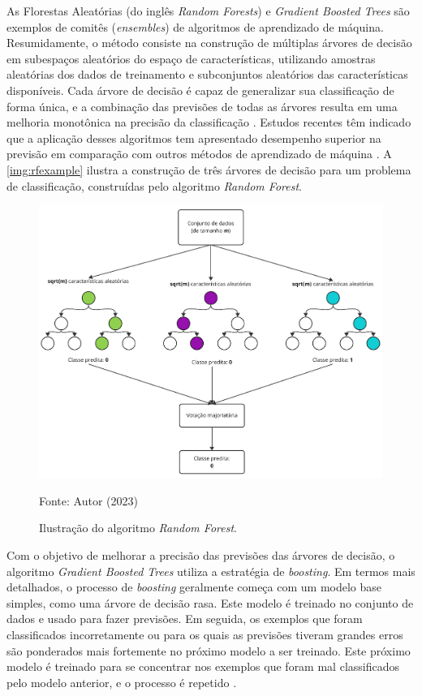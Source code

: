 As Florestas Aleatórias (do inglês \textit{Random Forests}) e \textit{Gradient Boosted Trees} são exemplos de comitês (\textit{ensembles}) de algoritmos de aprendizado de máquina. Resumidamente, o método consiste na construção de múltiplas árvores de decisão em subespaços aleatórios do espaço de características, utilizando amostras aleatórias dos dados de treinamento e subconjuntos aleatórios das características disponíveis. Cada árvore de decisão é capaz de generalizar sua classificação de forma única, e a combinação das previsões de todas as árvores resulta em uma melhoria monotônica na precisão da classificação \cite{RandomForests}. Estudos recentes têm indicado que a aplicação desses algoritmos tem apresentado desempenho superior na previsão em comparação com outros métodos de aprendizado de máquina \cite{geron2022hands, Raschka}. A \autoref{img:rfexample} ilustra a construção de três árvores de decisão para um problema de classificação, construídas pelo algoritmo \textit{Random Forest}.

\begin{figure}[H]
	\centering
	\caption{\label{img:rfexample}Ilustração do algoritmo \textit{Random Forest}.}
	\includegraphics[scale=0.7]{USPSC-img/random_forest_example.pdf}
	\begin{center}
		Fonte: Autor (2023)
	\end{center}
\end{figure}

Com o objetivo de melhorar a precisão das previsões das árvores de decisão, o algoritmo \textit{Gradient Boosted Trees} \cite{friedman2000} utiliza a estratégia de \textit{boosting}. Em termos mais detalhados, o processo de \textit{boosting} geralmente começa com um modelo base simples, como uma árvore de decisão rasa. Este modelo é treinado no conjunto de dados e usado para fazer previsões. Em seguida, os exemplos que foram classificados incorretamente ou para os quais as previsões tiveram grandes erros são ponderados mais fortemente no próximo modelo a ser treinado. Este próximo modelo é treinado para se concentrar nos exemplos que foram mal classificados pelo modelo anterior, e o processo é repetido \cite{friedman2000}.

